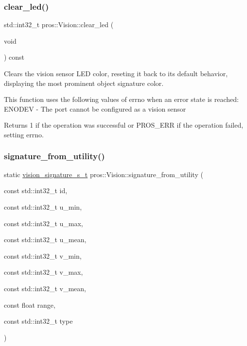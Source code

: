 \subsubsection{\texorpdfstring{clear\+\_\+led()}{clear\_led()}}
{\footnotesize\ttfamily std\+::int32\+\_\+t pros\+::\+Vision\+::clear\+\_\+led (\begin{DoxyParamCaption}\item[{void}]{ }\end{DoxyParamCaption}) const}



Clears the vision sensor L\+ED color, reseting it back to its default behavior, displaying the most prominent object signature color. 

This function uses the following values of errno when an error state is reached\+: E\+N\+O\+D\+EV -\/ The port cannot be configured as a vision sensor

\begin{DoxyReturn}{Returns}
1 if the operation was successful or P\+R\+O\+S\+\_\+\+E\+RR if the operation failed, setting errno. 
\end{DoxyReturn}
\mbox{\label{classpros_1_1Vision_aa46f3bfb4956c7061b34764c92fc68fd}} 
\subsubsection{\texorpdfstring{signature\+\_\+from\+\_\+utility()}{signature\_from\_utility()}}
{\footnotesize\ttfamily static \hyperlink{vision_8h_a135c729c7277f6cc019c2924088a5fd5}{vision\+\_\+signature\+\_\+s\+\_\+t} pros\+::\+Vision\+::signature\+\_\+from\+\_\+utility (\begin{DoxyParamCaption}\item[{const std\+::int32\+\_\+t}]{id,  }\item[{const std\+::int32\+\_\+t}]{u\+\_\+min,  }\item[{const std\+::int32\+\_\+t}]{u\+\_\+max,  }\item[{const std\+::int32\+\_\+t}]{u\+\_\+mean,  }\item[{const std\+::int32\+\_\+t}]{v\+\_\+min,  }\item[{const std\+::int32\+\_\+t}]{v\+\_\+max,  }\item[{const std\+::int32\+\_\+t}]{v\+\_\+mean,  }\item[{const float}]{range,  }\item[{const std\+::int32\+\_\+t}]{type }\end{DoxyParamCaption})\hspace{0.3cm}{\ttfamily [static]}}



